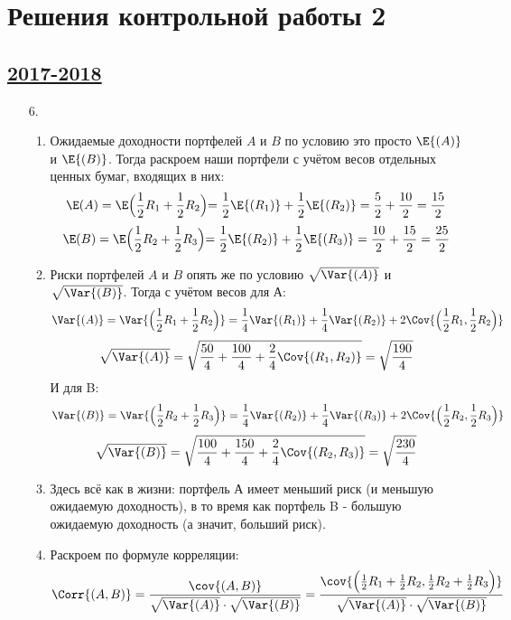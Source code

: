 \thispagestyle{empty}
\section{Решения контрольной работы 2}

\subsection[2017-2018]{\hyperref[sec:kr_02_2017_2018]{2017-2018}}
\label{sec:sol_kr_02_2017_2018}

\begin{enumerate}
\item[6.]
\begin{enumerate}
	\item Ожидаемые доходности портфелей $A$ и $B$ по условию это просто $\E{(A)}$ и $\E{(B)}$. Тогда раскроем наши портфели с учётом весов отдельных ценных бумаг, входящих в них:
	\[\E(A) = \E\Bigr(\frac{1}{2}R_{1}+\frac{1}{2}R_{2}\Bigl) = \frac{1}{2}\E{(R_{1})} + \frac{1}{2}\E{(R_{2})} = \frac{5}{2} + \frac{10}{2} = \frac{15}{2}
	\]
	\[\E(B) = \E\Bigr(\frac{1}{2}R_{2}+\frac{1}{2}R_{3}\Bigl) = \frac{1}{2}\E{(R_{2})} + \frac{1}{2}\E{(R_{3})} = \frac{10}{2} + \frac{15}{2} = \frac{25}{2}
	\]
	\item Риски портфелей $A$ и $B$ опять же по условию $\sqrt{\Var{(A)}}$ и $\sqrt{\Var{(B)}}$. Тогда с учётом весов для А:
	\[\Var{(A)} = \Var{\Bigr(\frac{1}{2}R_{1} + \frac{1}{2}R_{2}\Bigl)} = \frac{1}{4}\Var{(R_{1})} + \frac{1}{4}\Var{(R_{2})} + 2\Cov{\Bigr(\frac{1}{2}R_{1}, \frac{1}{2}R_{2}\Bigl)} \]
	\[\sqrt{\Var{(A)}} =  \sqrt{\frac{50}{4} + \frac{100}{4} + \frac{2}{4}\Cov{(R_{1}, R_{2})}} = \sqrt{\frac{190}{4}}
	\]
	И для B:
	\[\Var{(B)} = \Var{\Bigr(\frac{1}{2}R_{2} + \frac{1}{2}R_{3}\Bigl)} = \frac{1}{4}\Var{(R_{2})} + \frac{1}{4}\Var{(R_{3})} + 2\Cov{\Bigr(\frac{1}{2}R_{2}, \frac{1}{2}R_{3}\Bigl)} \]
	\[\sqrt{\Var{(B)}} =  \sqrt{\frac{100}{4} + \frac{150}{4} + \frac{2}{4}\Cov{(R_{2}, R_{3})}} = \sqrt{\frac{230}{4}}
	\]
	\item Здесь всё как в жизни:
	портфель А имеет меньший риск (и меньшую ожидаемую доходность), в то время как портфель B - большую ожидаемую доходность (а значит, больший риск).
	\item Раскроем по формуле корреляции:
	\[\Corr{(A, B)} = \frac{\cov{(A, B)}}{\sqrt{\Var{(A)}}\cdot \sqrt{\Var{(B)}}} = \frac{\cov{\Bigr(\frac{1}{2}R_{1} + \frac{1}{2}R_{2},\frac{1}{2}R_{2} + \frac{1}{2}R_{3}\Bigl)}}{\sqrt{\Var{(A)}}\cdot \sqrt{\Var{(B)}}} 
\]
\end{enumerate}
\end{enumerate}
